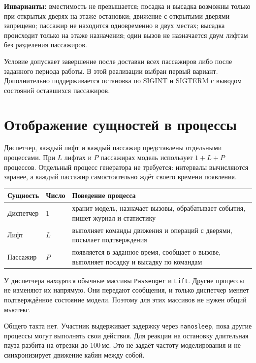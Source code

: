 \documentclass[12pt,a4paper]{article}
\begin{document}
\textbf{Инварианты:} вместимость не превышается; посадка и высадка
возможны только при открытых дверях на этаже остановки; движение с
открытыми дверями запрещено; пассажир не находится одновременно в двух
местах; высадка происходит только на этаже назначения; один вызов не
назначается двум лифтам без разделения пассажиров.

Условие допускает завершение после доставки всех пассажиров либо после
заданного периода работы. В этой реализации выбран первый вариант.
Дополнительно поддерживается остановка по SIGINT и SIGTERM с выводом
состояний оставшихся пассажиров.

\section{Отображение сущностей в процессы}

Диспетчер, каждый лифт и каждый пассажир представлены отдельными
процессами. При $L$ лифтах и $P$ пассажирах модель использует $1+L+P$
процессов. Отдельный процесс генератора не требуется: интервалы
вычисляются заранее, а каждый пассажир самостоятельно ждёт своего
времени появления.

\begin{center}
\begin{tabular}{@{}p{27mm}p{19mm}p{108mm}@{}}
\textbf{Сущность} & \textbf{Число} & \textbf{Поведение процесса} \\
\hline
Диспетчер & 1 & хранит модель, назначает вызовы, обрабатывает события,
пишет журнал и статистику \\
Лифт & $L$ & выполняет команды движения и операций с дверями,
посылает подтверждения \\
Пассажир & $P$ & появляется в заданное время, сообщает о вызове,
выполняет посадку и высадку по командам \\
\hline
\end{tabular}
\end{center}

У диспетчера находятся обычные массивы \verb|Passenger| и \verb|Lift|.
Другие процессы не изменяют их напрямую. Они передают сообщения, и
только диспетчер меняет подтверждённое состояние модели. Поэтому для
этих массивов не нужен общий мьютекс.

Общего такта нет. Участник выдерживает задержку через \verb|nanosleep|,
пока другие процессы могут выполнять свои действия. Для реакции на
остановку длительная пауза разбита на отрезки до 100\,мс. Это не задаёт
частоту моделирования и не синхронизирует движение кабин между собой.
\end{document}
